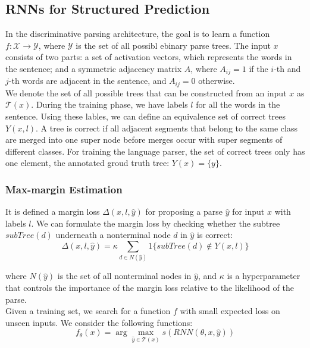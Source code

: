 \subsection{RNNs for Structured Prediction}

In the discriminative parsing architecture, the goal is to learn a function $f:
\mathcal{X} \rightarrow \mathcal{Y}$, where $\mathcal{Y}$ is the set of all
possibl ebinary parse trees. The input $x$ consists of two parts: a set of
activation vectors, which represents the words in the sentence; and a symmetric
adjacency matrix $A$, where $A_{ij} = 1$ if the $i$-th and $j$-th words are
adjacent in the sentence, and $A_{ij} = 0$ otherwise. \\
We denote the set of all possible trees that can be constructed from an input
$x$ as $\mathcal{T}(x)$. During the training phase, we have labels $l$ for all
the words in the sentence. Using these lables, we can define an equivalence set
of correct trees $Y(x, l)$. A tree is correct if all adjacent segments that
belong to the same class are merged into one super node before merges occur with
super segments of different classes. For training the language parser, the set
of correct trees only has one element, the annotated groud truth tree: $Y(x) =
\{y\}$.

\subsubsection{Max-margin Estimation}

It is defined a margin loss $\Delta(x, l, \hat{y})$ for proposing a parse
$\hat{y}$ for input $x$ with labels $l$. We can formulate the margin loss by
checking whether the subtree $subTree(d)$ underneath a nonterminal node $d$ in
$\hat{y}$ is correct:
\begin{equation}
	\Delta(x, l, \hat{y}) = \kappa \sum_{d \in N(\hat{y})} 1 \{ subTree(d) \not
	\in Y(x, l) \}
\end{equation}

where $N(\hat{y})$ is the set of all nonterminal nodes in $\hat{y}$, and
$\kappa$ is a hyperparameter that controls the importance of the margin loss
relative to the likelihood of the parse.\\

Given a training set, we search for a function $f$ with small expected loss on
unseen inputs. We consider the following functions:
\begin{equation}
	f_{\theta}(x) = \arg \max_{\hat{y} \in \mathcal{T}(x)} s(RNN(\theta, x,
	\hat{y}))
\end{equation}

